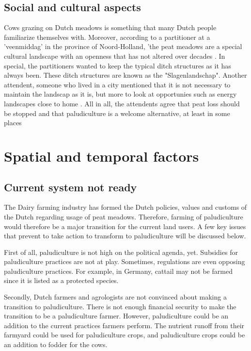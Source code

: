 {\subsection{Social and cultural aspects}
Cows grazing on Dutch meadows is something that many Dutch people familiarize themselves with. Moreover, according to a partitioner at a 'veenmiddag' in the province of Noord-Holland, 'the peat meadows are a special cultural landscape with an openness that has not altered over decades \citep{Dosker2017}. In special, the partitioners wanted to keep the typical ditch structures as it has always been. These ditch structures are known as the "Slagenlandschap". Another attendent, someone who lived in a city mentioned that it is not necessary to maintain the landscap as it is, but more to look at opportunies such as energy landscapes close to home \citep{Dosker2017}. All in all, the attendents agree that peat loss should be stopped and that paludiculture is a welcome alternative, at least in some places \citep{Dosker2017}


\section{Spatial and temporal factors}

\subsection{Current system not ready}
The Dairy farming industry has formed the Dutch policies, values and customs of the Dutch regarding usage of peat meadows. Therefore, farming of paludiculture would therefore be a major transition for the current land users. A few key issues that prevent to take action to transform to paludiculture will be discussed below.

First of all, paludiculture is not high on the political agenda, yet. Subsidies for paludiculture practices are not at play. Sometimes, regulations are even opposing paludiculture practices. For example, in Germany, cattail may not be farmed since it is listed as a protected species. 

Secondly, Dutch farmers and agrologists are not convinced about making a transition to paludiculture. There is not enough financial security to make the transition to be a paludiculture farmer. However, paludiculture could be an addition to the current practices farmers perform. The nutrient runoff from their farmyard could be used for paludiculture crops, and paludiculture crops could be an addition to fodder for the cows. 

}
